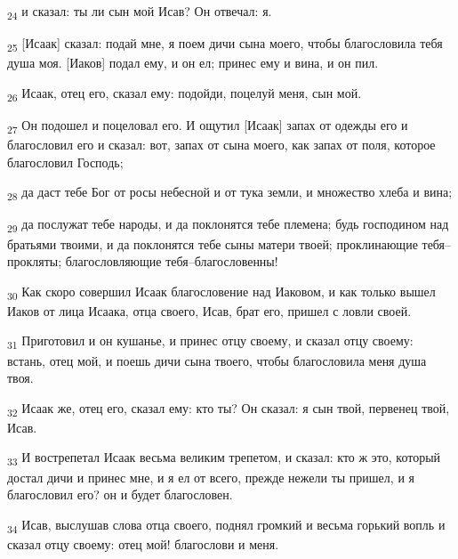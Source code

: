 \begin{tcolorbox}
\textsubscript{24} и сказал: ты ли сын мой Исав? Он отвечал: я.
\end{tcolorbox}
\begin{tcolorbox}
\textsubscript{25} [Исаак] сказал: подай мне, я поем дичи сына моего, чтобы благословила тебя душа моя. [Иаков] подал ему, и он ел; принес ему и вина, и он пил.
\end{tcolorbox}
\begin{tcolorbox}
\textsubscript{26} Исаак, отец его, сказал ему: подойди, поцелуй меня, сын мой.
\end{tcolorbox}
\begin{tcolorbox}
\textsubscript{27} Он подошел и поцеловал его. И ощутил [Исаак] запах от одежды его и благословил его и сказал: вот, запах от сына моего, как запах от поля, которое благословил Господь;
\end{tcolorbox}
\begin{tcolorbox}
\textsubscript{28} да даст тебе Бог от росы небесной и от тука земли, и множество хлеба и вина;
\end{tcolorbox}
\begin{tcolorbox}
\textsubscript{29} да послужат тебе народы, и да поклонятся тебе племена; будь господином над братьями твоими, и да поклонятся тебе сыны матери твоей; проклинающие тебя--прокляты; благословляющие тебя--благословенны!
\end{tcolorbox}
\begin{tcolorbox}
\textsubscript{30} Как скоро совершил Исаак благословение над Иаковом, и как только вышел Иаков от лица Исаака, отца своего, Исав, брат его, пришел с ловли своей.
\end{tcolorbox}
\begin{tcolorbox}
\textsubscript{31} Приготовил и он кушанье, и принес отцу своему, и сказал отцу своему: встань, отец мой, и поешь дичи сына твоего, чтобы благословила меня душа твоя.
\end{tcolorbox}
\begin{tcolorbox}
\textsubscript{32} Исаак же, отец его, сказал ему: кто ты? Он сказал: я сын твой, первенец твой, Исав.
\end{tcolorbox}
\begin{tcolorbox}
\textsubscript{33} И вострепетал Исаак весьма великим трепетом, и сказал: кто ж это, который достал дичи и принес мне, и я ел от всего, прежде нежели ты пришел, и я благословил его? он и будет благословен.
\end{tcolorbox}
\begin{tcolorbox}
\textsubscript{34} Исав, выслушав слова отца своего, поднял громкий и весьма горький вопль и сказал отцу своему: отец мой! благослови и меня.
\end{tcolorbox}
